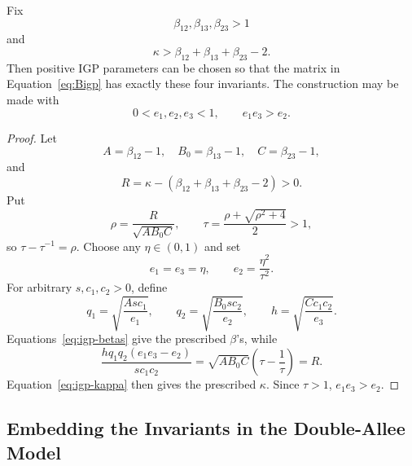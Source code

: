 \begin{Theorem}\label{thm:igp-realization}
Fix
\[
 \beta_{12},\beta_{13},\beta_{23}>1
\]
and
\begin{equation}
 \kappa>
 \beta_{12}+\beta_{13}+\beta_{23}-2.
 \label{eq:igp-target}
\end{equation}
Then positive IGP parameters can be chosen so that the matrix in Equation~\eqref{eq:Bigp} has exactly these four invariants. The construction may be made with
\[
 0<e_1,e_2,e_3<1,
 \qquad
 e_1e_3>e_2.
\]
\end{Theorem}

\begin{proof}
Let
\[
 A=\beta_{12}-1,\quad
 B_0=\beta_{13}-1,\quad
 C=\beta_{23}-1,
\]
and
\[
 R=\kappa-(\beta_{12}+\beta_{13}+\beta_{23}-2)>0.
\]
Put
\[
 \rho=\frac{R}{\sqrt{AB_0C}},
 \qquad
 \tau=\frac{\rho+\sqrt{\rho^2+4}}{2}>1,
\]
so \(\tau-\tau^{-1}=\rho\). Choose any \(\eta\in(0,1)\) and set
\[
 e_1=e_3=\eta,
 \qquad
 e_2=\frac{\eta^2}{\tau^2}.
\]
For arbitrary \(s,c_1,c_2>0\), define
\begin{equation}
 q_1=\sqrt{\frac{Asc_1}{e_1}},
 \qquad
 q_2=\sqrt{\frac{B_0sc_2}{e_2}},
 \qquad
 h=\sqrt{\frac{Cc_1c_2}{e_3}}.
 \label{eq:igp-right-inverse}
\end{equation}
Equations~\eqref{eq:igp-betas} give the prescribed \(\beta\)'s, while
\[
 \frac{hq_1q_2(e_1e_3-e_2)}{sc_1c_2}
 =
 \sqrt{AB_0C}\left(\tau-\frac1\tau\right)
 =R.
\]
Equation~\eqref{eq:igp-kappa} then gives the prescribed \(\kappa\). Since \(\tau>1\), \(e_1e_3>e_2\).
\end{proof}

\subsection{Embedding the Invariants in the Double-Allee Model}


